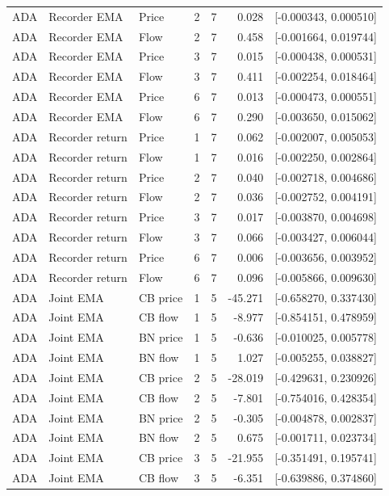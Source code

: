 {\begin{longtable}{lllrrrl}
ADA & Recorder EMA & Price & 2 & 7 & 0.028 & [-0.000343, 0.000510]\\
ADA & Recorder EMA & Flow & 2 & 7 & 0.458 & [-0.001664, 0.019744]\\
ADA & Recorder EMA & Price & 3 & 7 & 0.015 & [-0.000438, 0.000531]\\
ADA & Recorder EMA & Flow & 3 & 7 & 0.411 & [-0.002254, 0.018464]\\
ADA & Recorder EMA & Price & 6 & 7 & 0.013 & [-0.000473, 0.000551]\\
ADA & Recorder EMA & Flow & 6 & 7 & 0.290 & [-0.003650, 0.015062]\\
ADA & Recorder return & Price & 1 & 7 & 0.062 & [-0.002007, 0.005053]\\
ADA & Recorder return & Flow & 1 & 7 & 0.016 & [-0.002250, 0.002864]\\
ADA & Recorder return & Price & 2 & 7 & 0.040 & [-0.002718, 0.004686]\\
ADA & Recorder return & Flow & 2 & 7 & 0.036 & [-0.002752, 0.004191]\\
ADA & Recorder return & Price & 3 & 7 & 0.017 & [-0.003870, 0.004698]\\
ADA & Recorder return & Flow & 3 & 7 & 0.066 & [-0.003427, 0.006044]\\
ADA & Recorder return & Price & 6 & 7 & 0.006 & [-0.003656, 0.003952]\\
ADA & Recorder return & Flow & 6 & 7 & 0.096 & [-0.005866, 0.009630]\\
ADA & Joint EMA & CB price & 1 & 5 & -45.271 & [-0.658270, 0.337430]\\
ADA & Joint EMA & CB flow & 1 & 5 & -8.977 & [-0.854151, 0.478959]\\
ADA & Joint EMA & BN price & 1 & 5 & -0.636 & [-0.010025, 0.005778]\\
ADA & Joint EMA & BN flow & 1 & 5 & 1.027 & [-0.005255, 0.038827]\\
ADA & Joint EMA & CB price & 2 & 5 & -28.019 & [-0.429631, 0.230926]\\
ADA & Joint EMA & CB flow & 2 & 5 & -7.801 & [-0.754016, 0.428354]\\
ADA & Joint EMA & BN price & 2 & 5 & -0.305 & [-0.004878, 0.002837]\\
ADA & Joint EMA & BN flow & 2 & 5 & 0.675 & [-0.001711, 0.023734]\\
ADA & Joint EMA & CB price & 3 & 5 & -21.955 & [-0.351491, 0.195741]\\
ADA & Joint EMA & CB flow & 3 & 5 & -6.351 & [-0.639886, 0.374860]\\

\end{longtable}}
